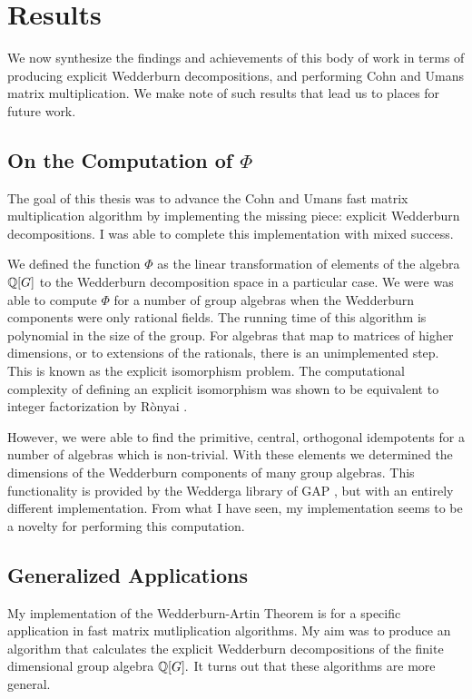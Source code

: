 \documentclass[../thesis.tex]{subfiles}
\begin{document}
\section{Results}\label{sec:results}
We now synthesize the findings and achievements of this body of work in terms of producing explicit Wedderburn decompositions, and performing Cohn and Umans matrix multiplication. We make note of such results that lead us to places for future work.

\subsection{On the Computation of $\Phi$}\label{sec:results/phi}
The goal of this thesis was to advance the Cohn and Umans fast matrix multiplication algorithm by implementing the missing piece: explicit Wedderburn decompositions. I was able to complete this implementation with mixed success. 

We defined the function $\Phi$ as the linear transformation of elements of the algebra $\mathbb{Q}[G]$ to the Wedderburn decomposition space in a particular case. We were was able to compute $\Phi$ for a number of group algebras when the Wedderburn components were only rational fields. The running time of this algorithm is polynomial in the size of the group. For algebras that map to matrices of higher dimensions, or to extensions of the rationals, there is an unimplemented step. This is known as the explicit isomorphism problem. The computational complexity of defining an explicit isomorphism was shown to be equivalent to integer factorization by R\`onyai \cite{SimpleAlgebrasAreDifficult}.

However, we were able to find the primitive, central, orthogonal idempotents for a number of algebras which is non-trivial. With these elements we determined the dimensions of the Wedderburn components of many group algebras. This functionality is provided by the Wedderga \cite{wedderga} library of GAP \cite{gap}, but with an entirely different implementation. From what I have seen, my implementation seems to be a novelty for performing this computation.

\subsection{Generalized Applications}\label{sec:Results/Applications}
My implementation of the Wedderburn-Artin Theorem is for a specific application in  fast matrix mutliplication algorithms. My aim was to produce an algorithm that calculates the explicit Wedderburn decompositions of the finite dimensional group algebra $\mathbb{Q}[G].$ It turns out that these algorithms are more general. 
\end{document}
